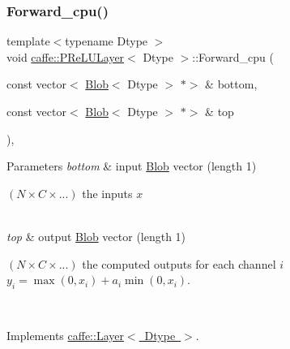 \mbox{\label{classcaffe_1_1_p_re_l_u_layer_ab29811e077cc15d6751366d3f918acd6}} 
\subsubsection{\texorpdfstring{Forward\+\_\+cpu()}{Forward\_cpu()}\hspace{0.1cm}{\footnotesize\ttfamily [2/2]}}
{\footnotesize\ttfamily template$<$typename Dtype $>$ \\
void \mbox{\hyperlink{classcaffe_1_1_p_re_l_u_layer}{caffe\+::\+P\+Re\+L\+U\+Layer}}$<$ Dtype $>$\+::Forward\+\_\+cpu (\begin{DoxyParamCaption}\item[{const vector$<$ \mbox{\hyperlink{classcaffe_1_1_blob}{Blob}}$<$ Dtype $>$ $\ast$$>$ \&}]{bottom,  }\item[{const vector$<$ \mbox{\hyperlink{classcaffe_1_1_blob}{Blob}}$<$ Dtype $>$ $\ast$$>$ \&}]{top }\end{DoxyParamCaption})\hspace{0.3cm}{\ttfamily [protected]}, {\ttfamily [virtual]}}


\begin{DoxyParams}{Parameters}
{\em bottom} & input \mbox{\hyperlink{classcaffe_1_1_blob}{Blob}} vector (length 1)
\begin{DoxyEnumerate}
\item $ (N \times C \times ...) $ the inputs $ x $ 
\end{DoxyEnumerate}\\
\hline
{\em top} & output \mbox{\hyperlink{classcaffe_1_1_blob}{Blob}} vector (length 1)
\begin{DoxyEnumerate}
\item $ (N \times C \times ...) $ the computed outputs for each channel $i$ $ y_i = \max(0, x_i) + a_i \min(0, x_i) $. 
\end{DoxyEnumerate}\\
\hline
\end{DoxyParams}


Implements \mbox{\hyperlink{classcaffe_1_1_layer_a576ac6a60b1e99fe383831f52a6cea77}{caffe\+::\+Layer$<$ Dtype $>$}}.

\mbox{\label{classcaffe_1_1_p_re_l_u_layer_ae4e9910b4258f17531cfe0c2229a7857}} 
